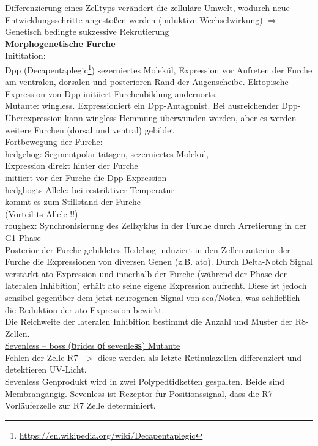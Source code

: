 Differenzierung eines Zelltyps verändert die zelluläre Umwelt, wodurch neue Entwicklungsschritte angestoßen werden (induktive Wechselwirkung) $\Rightarrow$
Genetisch bedingte sukzessive Rekrutierung\\

\textbf{Morphogenetische Furche}\\
Inititation:\\
Dpp (Decapentaplegic\footnote{\url{https://en.wikipedia.org/wiki/Decapentaplegic}}) sezerniertes Molekül, Expression vor Aufreten der Furche am ventralen, dorsalen und posterioren Rand der Augenscheibe. Ektopische Expression von Dpp initiiert Furchenbildung andernorts.\\

Mutante: wingless. Expressioniert ein Dpp-Antagonist. Bei ausreichender Dpp-Überexpression kann wingless-Hemmung überwunden werden, aber es werden weitere Furchen (dorsal und ventral) gebildet\\

\underline{Fortbewegung der Furche:}\\
hedgehog: Segmentpolaritätsgen, sezerniertes Molekül,\\
Expression direkt hinter der Furche\\
initiiert vor der Furche die Dpp-Expression\\
hedghogts-Allele: bei restriktiver Temperatur\\
kommt es zum Stillstand der Furche\\
(Vorteil ts-Allele !!)\\
roughex: Synchronisierung des Zellzyklus in der Furche durch Arretierung in der G1-Phase\\
Posterior der Furche gebildetes Hedehog induziert in den Zellen anterior der Furche die Expressionen von diversen Genen (z.B. ato). Durch Delta-Notch Signal verstärkt ato-Expression und innerhalb der Furche (während der Phase der lateralen Inhibition) erhält ato seine eigene Expression aufrecht. Diese ist jedoch sensibel gegenüber dem jetzt neurogenen Signal von sca/Notch, was schließlich die Reduktion der ato-Expression bewirkt.\\

Die Reichweite der lateralen Inhibition bestimmt die Anzahl und Muster der R8-Zellen.\\

\underline{Sevenless – boss (\textbf{b}rides \textbf{o}f sevenle\textbf{ss}) Mutante}\\
Fehlen der Zelle R7 -$>$ diese werden als letzte Retinulazellen differenziert und detektieren UV-Licht.\\
Sevenless Genprodukt wird in zwei Polypedtidketten gespalten. Beide sind Membrangängig. Sevenless ist Rezeptor für Positionssignal, dass die R7-Vorläuferzelle zur R7 Zelle determiniert.\\

